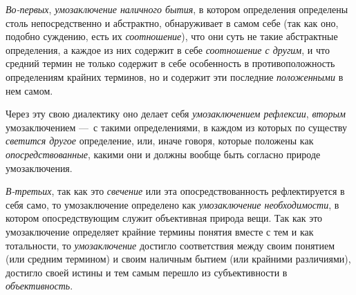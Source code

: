 \documentclass[twoside]{article}
\begin{document}
{{{{\em Во-первых},
{\em умозаключение наличного бытия},
в котором определения определены столь непосредственно и
абстрактно, обнаруживает в самом себе (так как оно, подобно суждению, есть
их {\em соотношение}),
что они суть не такие абстрактные определения, а каждое из
них содержит в себе {\em соотношение с
другим}, и что средний термин не только содержит в себе
особенность в противоположность определениям крайних терминов, но и
содержит эти последние
{\em положенными} в нем
самом.

Через эту свою диалектику оно делает себя
{\em умозаключением рефлексии},
{\em вторым}
умозаключением —~с такими определениями, в
каждом из которых по существу
{\em светится другое}
определение, или, иначе говоря, которые положены как
{\em опосредствованные},
какими они и должны вообще быть согласно природе
умозаключения.

{\em В-третьих}, так как
это {\em свечение} или
эта опосредствованность рефлектируется в себя само, то умозаключение
определено как {\em умозаключение
необходимости}, в котором опосредствующим служит объективная
природа вещи. Так как это умозаключение определяет крайние термины понятия
вместе с тем и как тотальности, то
{\em умозаключение}
достигло соответствия между своим понятием (или средним
термином) и своим наличным бытием (или крайними различиями), достигло своей
истины и тем самым перешло из субъективности в
{\em объективность}.

}}}
\end{document}
